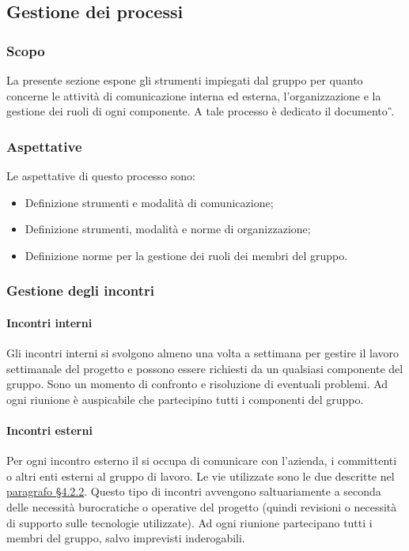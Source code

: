 \subsection{Gestione dei processi}
\subsubsection{Scopo}
La presente sezione espone gli strumenti impiegati dal gruppo \teamname{} per quanto concerne le attività di comunicazione interna ed esterna, l'organizzazione e la gestione dei ruoli di ogni componente.
A tale processo è dedicato il documento \PdP{}\textit{\G}.

\subsubsection{Aspettative}
Le aspettative di questo processo sono:
\begin{itemize}
	\item Definizione strumenti e modalità di comunicazione;
	\item Definizione strumenti, modalità e norme di organizzazione;
	\item Definizione norme per la gestione dei ruoli dei membri del gruppo.
\end{itemize}


		
\subsubsection{Gestione degli incontri}
	\paragraph{Incontri interni}
	Gli incontri interni si svolgono almeno una volta a settimana per gestire il lavoro settimanale del progetto e possono essere richiesti da un qualsiasi componente del gruppo. Sono un momento di confronto e risoluzione di eventuali problemi. Ad ogni riunione è auspicabile che partecipino tutti i componenti del gruppo.
	\paragraph{Incontri esterni}
	Per ogni incontro esterno il \RdP{} si occupa di comunicare con l'azienda, i committenti o altri enti esterni al gruppo di lavoro. 
	Le vie utilizzate sono le due descritte nel \hyperref[sec:Comunicazioni esterne]{paragrafo \S4.2.2}.
	Questo tipo di incontri avvengono saltuariamente a seconda delle necessità burocratiche o operative del progetto (quindi revisioni o necessità di supporto sulle tecnologie utilizzate).
	Ad ogni riunione partecipano tutti i membri del gruppo, salvo imprevisti inderogabili.
